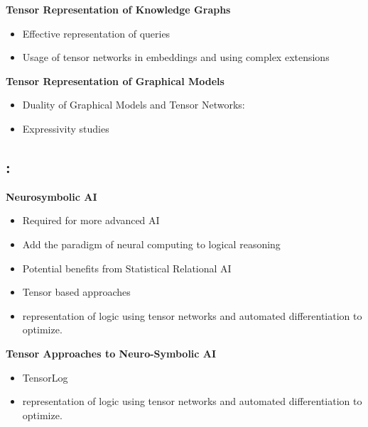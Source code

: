 \textbf{Tensor Representation of Knowledge Graphs}
\begin{itemize}
    \item Effective representation of queries
    \item Usage of tensor networks in embeddings \cite{yang_embedding_2015} and using complex extensions \cite{trouillon_complex_2017, trouillon_knowledge_2017}
\end{itemize}

\textbf{Tensor Representation of Graphical Models}
\begin{itemize}
    \item Duality of Graphical Models and Tensor Networks:
    \cite{robeva_duality_2019}
    \item Expressivity studies \cite{glasser_expressive_2019}
\end{itemize}

\subsection{: \parttwotext}

\textbf{Neurosymbolic AI}
\begin{itemize}
    \item Required for more advanced AI \cite{hochreiter_toward_2022}
    \item Add the paradigm of neural computing to logical reasoning
    \item Potential benefits from Statistical Relational AI \cite{marra_statistical_2024}
    \item Tensor based approaches \cite{cohen_tensorlog_2020}
    \item \cite{badreddine_logic_2022} representation of logic using tensor networks and automated differentiation to optimize.
\end{itemize}


\textbf{Tensor Approaches to Neuro-Symbolic AI}
\begin{itemize}
    \item TensorLog \cite{cohen_tensorlog_2020}
    \item \cite{badreddine_logic_2022} representation of logic using tensor networks and automated differentiation to optimize.
\end{itemize}

